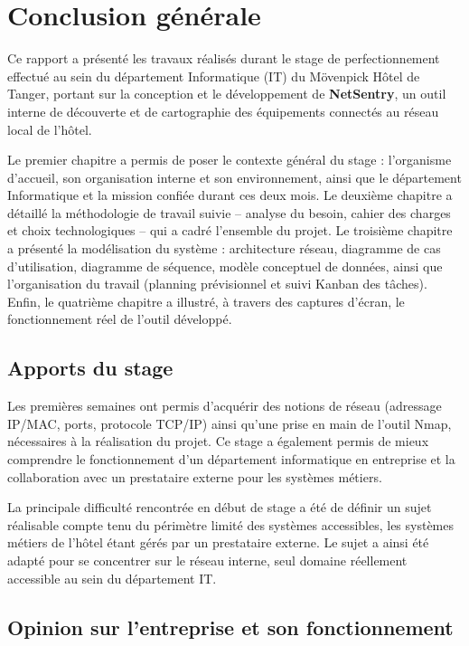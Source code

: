 \chapter*{Conclusion générale}

Ce rapport a présenté les travaux réalisés durant le stage de perfectionnement effectué
au sein du département Informatique (IT) du Mövenpick Hôtel de Tanger, portant sur la
conception et le développement de \textbf{NetSentry}, un outil interne de découverte et
de cartographie des équipements connectés au réseau local de l'hôtel.

Le premier chapitre a permis de poser le contexte général du stage : l'organisme
d'accueil, son organisation interne et son environnement, ainsi que le département
Informatique et la mission confiée durant ces deux mois. Le deuxième chapitre a détaillé
la méthodologie de travail suivie -- analyse du besoin, cahier des charges et choix
technologiques -- qui a cadré l'ensemble du projet. Le troisième chapitre a présenté la
modélisation du système : architecture réseau, diagramme de cas d'utilisation, diagramme
de séquence, modèle conceptuel de données, ainsi que l'organisation du travail (planning
prévisionnel et suivi Kanban des tâches). Enfin, le quatrième chapitre a illustré, à
travers des captures d'écran, le fonctionnement réel de l'outil développé.

\section*{Apports du stage}

Les premières semaines ont permis d'acquérir des notions de réseau (adressage IP/MAC,
ports, protocole TCP/IP) ainsi qu'une prise en main de l'outil Nmap, nécessaires à la
réalisation du projet. Ce stage a également permis de mieux comprendre le fonctionnement
d'un département informatique en entreprise et la collaboration avec un prestataire
externe pour les systèmes métiers.

La principale difficulté rencontrée en début de stage a été de définir un sujet
réalisable compte tenu du périmètre limité des systèmes accessibles, les systèmes
métiers de l'hôtel étant gérés par un prestataire externe. Le sujet a ainsi été adapté
pour se concentrer sur le réseau interne, seul domaine réellement accessible au sein du
département IT.

\section*{Opinion sur l'entreprise et son fonctionnement}

